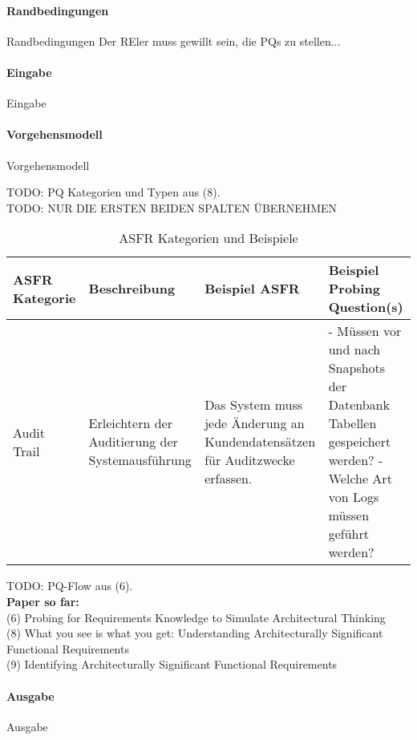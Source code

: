\paragraph{Randbedingungen}

Randbedingungen
Der REler muss gewillt sein, die PQs zu stellen...\\

\paragraph{Eingabe}

Eingabe


\paragraph{Vorgehensmodell}

Vorgehensmodell


TODO: PQ Kategorien und Typen aus (8). \\


TODO: NUR DIE ERSTEN BEIDEN SPALTEN ÜBERNEHMEN

\begin{table*}[h] %
\caption{ASFR Kategorien und Beispiele}
\begin{tabular}{|p{2cm}|p{4cm}|p{4cm}|p{6cm}|}%
	\hline
	\textbf{ASFR Kategorie} & \textbf{Beschreibung} & \textbf{Beispiel ASFR} & \textbf{Beispiel Probing Question(s)} \\
	\hline
  	Audit Trail & Erleichtern der Auditierung der Systemausführung & Das System muss jede Änderung an Kundendatensätzen für Auditzwecke erfassen. & - Müssen vor und nach Snapshots der Datenbank Tabellen gespeichert werden? \newline - Welche Art von Logs müssen geführt werden? \\
	\hline
\end{tabular}
\label{tab:asfr_category_table}
\end{table*}


TODO: PQ-Flow aus (6). \\


\textbf{Paper so far:} \\
(6) Probing for Requirements Knowledge to Simulate Architectural Thinking \\
(8) What you see is what you get: Understanding Architecturally Significant Functional Requirements \\
(9) Identifying Architecturally Significant Functional Requirements \\


\paragraph{Ausgabe}

Ausgabe
